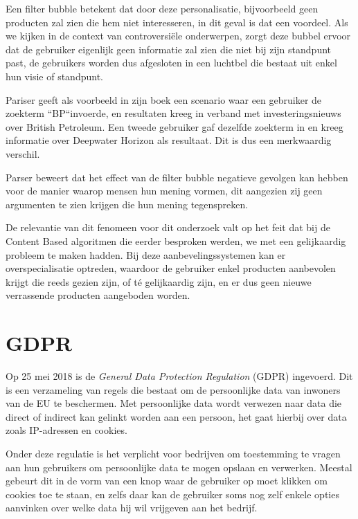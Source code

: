 Een filter bubble betekent dat door deze personalisatie, bijvoorbeeld geen producten zal zien die hem niet interesseren, in dit geval is dat een voordeel. Als we kijken in de context van controversiële onderwerpen, zorgt deze bubbel ervoor dat de gebruiker eigenlijk geen informatie zal zien die niet bij zijn standpunt past, de gebruikers worden dus afgesloten in een luchtbel die bestaat uit enkel hun visie of standpunt.  \autocite{Pariser2011}

Pariser geeft als voorbeeld in zijn boek een scenario waar een gebruiker de zoekterm ``BP``invoerde, en resultaten kreeg in verband met investeringsnieuws over British Petroleum. Een tweede gebruiker gaf dezelfde zoekterm in en kreeg informatie over Deepwater Horizon als resultaat. Dit is dus een merkwaardig verschil.

Parser beweert dat het effect van de filter bubble negatieve gevolgen kan hebben voor de manier waarop mensen hun mening vormen, dit aangezien zij geen argumenten te zien krijgen die hun mening tegenspreken.


De relevantie van dit fenomeen voor dit onderzoek valt op het feit dat bij de Content Based algoritmen die eerder besproken werden, we met een gelijkaardig probleem te maken hadden. Bij deze aanbevelingssystemen kan er overspecialisatie optreden, waardoor de gebruiker enkel producten aanbevolen krijgt die reeds gezien zijn, of té gelijkaardig zijn, en er dus geen nieuwe verrassende producten aangeboden worden.

\section{GDPR}
\label{sec:GDPR}

Op 25 mei 2018 is de \textit{General Data Protection Regulation} (GDPR) ingevoerd. Dit is een verzameling van regels die bestaat om de persoonlijke data van inwoners van de EU te beschermen. Met persoonlijke data wordt verwezen naar data die direct of indirect kan gelinkt worden aan een persoon, het gaat hierbij over data zoals IP-adressen en cookies. 

Onder deze regulatie is het verplicht voor bedrijven om toestemming te vragen aan hun gebruikers om persoonlijke data te mogen opslaan en verwerken. Meestal gebeurt dit in de vorm van een knop waar de gebruiker op moet klikken om cookies toe te staan, en zelfs daar kan de gebruiker soms nog zelf enkele opties aanvinken over welke data hij wil vrijgeven aan het bedrijf. \autocite{Goddard2017}

